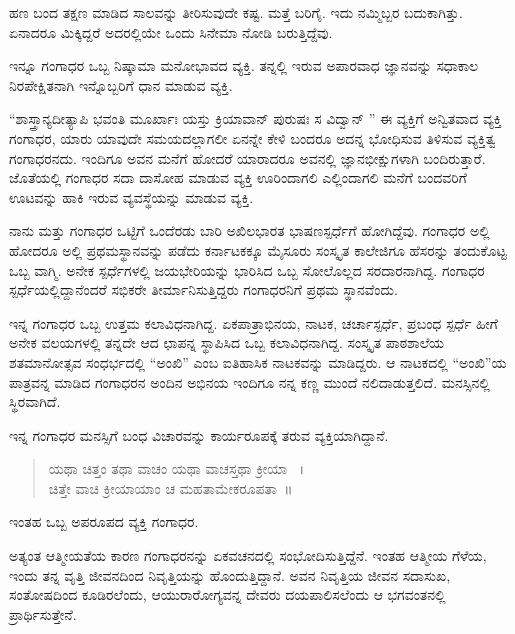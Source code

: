 {ಹಣ ಬಂದ ತಕ್ಷಣ ಮಾಡಿದ ಸಾಲವನ್ನು ತೀರಿಸುವುದೇ ಕಷ್ಟ. ಮತ್ತೆ ಬರಿಗೈ. ಇದು ನಮ್ಮಿಬ್ಬರ ಬದುಕಾಗಿತ್ತು. ಏನಾದರೂ ಮಿಕ್ಕಿದ್ದರೆ ಅದರಲ್ಲಿಯೇ ಒಂದು ಸಿನೇಮಾ ನೋಡಿ ಬರುತ್ತಿದ್ದೆವು. 
\vskip 2pt

ಇನ್ನೂ ಗಂಗಾಧರ ಒಬ್ಬ ನಿಷ್ಕಾಮಾ ಮನೋಭಾವದ ವ್ಯಕ್ತಿ. ತನ್ನಲ್ಲಿ ಇರುವ ಅಪಾರವಾಧ ಜ್ಞಾನವನ್ನು ಸಧಾಕಾಲ ನಿರಪೇಕ್ಷಿತನಾಗಿ  ಇನ್ನೊಬ್ಬರಿಗೆ ಧಾನ ಮಾಡುವ ವ್ಯಕ್ತಿ.
\vskip 2pt

“ಶಾಸ್ತ್ರಾನ್ಯದೀತ್ಯಾಪಿ ಭವಂತಿ ಮೂರ್ಖಾಃ ಯಸ್ತು ಕ್ರಿಯಾವಾನ್ ಪುರುಷಃ ಸ ವಿದ್ವಾನ್ ” ಈ ವ್ಯಕ್ತಿಗೆ ಅನ್ವಿತವಾದ ವ್ಯಕ್ತಿ ಗಂಗಾಧರ,  ಯಾರು ಯಾವುದೇ ಸಮಯದಲ್ಲಾಗಲೀ ಏನನ್ನೇ ಕೇಳಿ ಬಂದರೂ  ಅದನ್ನ ಭೋಧಿಸುವ ತಿಳಿಸುವ ವ್ಯಕ್ತಿತ್ವ ಗಂಗಾಧರ\-ನದು.  ಇಂದಿಗೂ ಅವನ ಮನೆಗೆ ಹೋದರೆ ಯಾರಾದರೂ  ಅವನಲ್ಲಿ ಜ್ಞಾನಭೀಕ್ಷುಗ\-ಳಾಗಿ ಬಂದಿರುತ್ತಾರೆ. ಜೊತೆಯಲ್ಲಿ ಗಂಗಾಧರ ಸದಾ ದಾಸೋಹ ಮಾಡುವ ವ್ಯಕ್ತಿ ಊರಿಂದಾಗಲಿ ಎಲ್ಲಿಂದಾಗಲಿ  ಮನೆಗೆ ಬಂದವರಿಗೆ ಊಟವನ್ನು ಹಾಕಿ ಇರುವ ವ್ಯವಸ್ಥೆಯನ್ನು  ಮಾಡುವ ವ್ಯಕ್ತಿ. 
\vskip 2pt

ನಾನು ಮತ್ತು ಗಂಗಾಧರ ಒಟ್ಟಿಗೆ ಒಂದೆರಡು ಬಾರಿ ಅಖಿಲಭಾರತ ಭಾಷಣ\-ಸ್ಪರ್ಧೆಗೆ ಹೋಗಿದ್ದೆವು. ಗಂಗಾಧರ ಅಲ್ಲಿ ಹೋದರೂ ಅಲ್ಲಿ ಪ್ರಥಮಸ್ಥಾನವನ್ನು ಪಡೆದು ಕರ್ನಾಟಕಕ್ಕೂ ಮೈಸೂರು ಸಂಸ್ಕೃತ ಕಾಲೇಜಿಗೂ ಹೆಸರನ್ನು ತಂದುಕೊಟ್ಟ ಒಬ್ಬ ವಾಗ್ಮಿ. ಅನೇಕ ಸ್ಪರ್ಧೆಗಳಲ್ಲಿ ಜಯಭೇರಿಯನ್ನು ಭಾರಿಸಿದ ಒಬ್ಬ ಸೋಲೊಲ್ಲದ ಸರದಾರನಾಗಿದ್ದ. ಗಂಗಾಧರ ಸ್ಪರ್ಧೆಯಲ್ಲಿದ್ದಾನೆಂದರೆ ಸಭಿಕರೇ ತೀರ್ಮಾನಿಸುತ್ತಿದ್ದರು ಗಂಗಾಧರನಿಗೆ ಪ್ರಥಮ ಸ್ಥಾನವೆಂದು. 

ಇನ್ನ ಗಂಗಾಧರ  ಒಬ್ಬ ಉತ್ತಮ ಕಲಾವಿಧನಾಗಿದ್ದ. ಏಕಪಾತ್ರಾಭಿನಯ,  ನಾಟಕ,  ಚರ್ಚಾಸ್ಪರ್ಧೆ,  ಪ್ರಬಂಧ ಸ್ಪರ್ಧೆ ಹೀಗೆ    ಅನೇಕ ವಲಯಗಳಲ್ಲಿ ತನ್ನದೇ ಆದ ಛಾಪನ್ನ ಸ್ಥಾಪಿಸಿದ ಒಬ್ಬ ಕಲಾವಿಧನಾಗಿದ್ದ. ಸಂಸ್ಕೃತ ಪಾಠಶಾಲೆಯ ಶತಮಾನೋತ್ಸವ ಸಂಧರ್ಭ\-ದಲ್ಲಿ  “ಅಂಖಿ” ಎಂಬ ಐತಿಹಾಸಿಕ ನಾಟಕವನ್ನು ಮಾಡಿದ್ದರು. ಆ ನಾಟಕದಲ್ಲಿ “ಅಂಖಿ”ಯ ಪಾತ್ರವನ್ನ ಮಾಡಿದ ಗಂಗಾಧರನ ಅಂದಿನ ಅಭಿನಯ ಇಂದಿಗೂ ನನ್ನ ಕಣ್ಣ ಮುಂದೆ ನಲಿದಾಡುತ್ತಲಿದೆ. ಮನಸ್ಸಿನಲ್ಲಿ ಸ್ಥಿರವಾಗಿದೆ.

ಇನ್ನ ಗಂಗಾಧರ ಮನಸ್ಸಿಗೆ ಬಂಧ ವಿಚಾರವನ್ನು ಕಾರ್ಯರೂಪಕ್ಕೆ ತರುವ ವ್ಯಕ್ತಿಯಾಗಿದ್ದಾನೆ.

\begin{verse}
ಯಥಾ ಚಿತ್ತಂ  ತಥಾ ವಾಚಂ ಯಥಾ ವಾಚಸ್ತಥಾ ಕ್ರೀಯಾ ~।\\
ಚಿತ್ತೇ ವಾಚಿ ಕ್ರೀಯಾಯಾಂ  ಚ ಮಹತಾಮೇಕರೂಪತಾ~॥
\end{verse}

ಇಂತಹ ಒಬ್ಬ ಅಪರೂಪದ ವ್ಯಕ್ತಿ ಗಂಗಾಧರ.        

ಅತ್ಯಂತ ಆತ್ಮೀಯತೆಯ ಕಾರಣ ಗಂಗಾಧರನನ್ನು  ಏಕವಚನದಲ್ಲಿ ಸಂಭೋದಿಸುತ್ತಿದ್ದೆನೆ. ಇಂತಹ ಆತ್ಮೀಯ ಗೆಳೆಯ,  ಇಂದು ತನ್ನ ವೃತ್ತಿ ಜೀವನದಿಂದ ನಿವೃತ್ತಿಯನ್ನು ಹೊಂದುತ್ತಿದ್ದಾನೆ. ಅವನ ನಿವೃತ್ತಿಯ ಜೀವನ ಸದಾಸುಖ,  ಸಂತೋಷದಿಂದ ಕೂಡಿರ\-ಲೆಂದು,  ಆಯುರಾರೋಗ್ಯವನ್ನ ದೇವರು ದಯಪಾಲಿಸಲೆಂದು ಆ ಭಗವಂತನಲ್ಲಿ ಪ್ರಾರ್ಥಿಸುತ್ತೇನೆ. 

\articleend									
}
